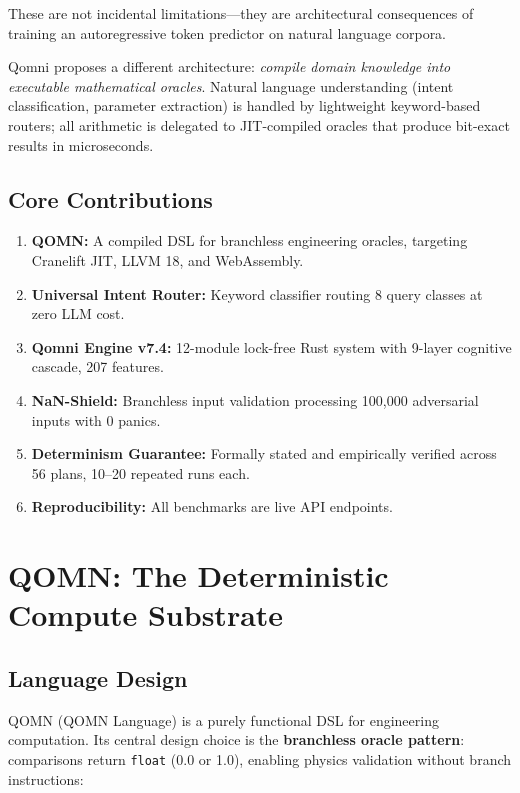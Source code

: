 \documentclass[11pt]{article}
\begin{document}
These are not incidental limitations---they are architectural consequences of
training an autoregressive token predictor on natural language corpora.

Qomni proposes a different architecture: \emph{compile domain knowledge into
executable mathematical oracles}. Natural language understanding (intent
classification, parameter extraction) is handled by lightweight keyword-based
routers; all arithmetic is delegated to JIT-compiled oracles that produce
bit-exact results in microseconds.

\subsection{Core Contributions}

\begin{enumerate}
\item \textbf{QOMN:} A compiled DSL for branchless engineering oracles,
      targeting Cranelift JIT, LLVM 18, and WebAssembly.
\item \textbf{Universal Intent Router:} Keyword classifier routing 8 query
      classes at zero LLM cost.
\item \textbf{Qomni Engine v7.4:} 12-module lock-free Rust system with
      9-layer cognitive cascade, 207 features.
\item \textbf{NaN-Shield:} Branchless input validation processing 100,000
      adversarial inputs with 0 panics.
\item \textbf{Determinism Guarantee:} Formally stated and empirically verified
      across 56 plans, 10--20 repeated runs each.
\item \textbf{Reproducibility:} All benchmarks are live API endpoints.
\end{enumerate}

\section{QOMN: The Deterministic Compute Substrate}

\subsection{Language Design}

QOMN (QOMN Language) is a purely functional DSL for engineering computation.
Its central design choice is the \textbf{branchless oracle pattern}:
comparisons return \texttt{float} (0.0 or 1.0), enabling physics validation
without branch instructions:
\end{document}
